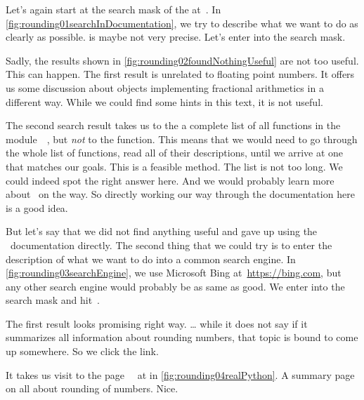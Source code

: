 Let's again start at the search mask of the  at~.
In \cref{fig:rounding01searchInDocumentation}, we try to describe what we want to do as clearly as possible.
 is maybe not very precise.
Let's enter  into the search mask.

Sadly, the results shown in \cref{fig:rounding02foundNothingUseful} are not too useful.
This can happen.
The first result is unrelated to floating point numbers.
It offers us some discussion about objects implementing fractional arithmetics in a different way.
While we could find some hints in this text, it is not useful.

The second search result takes us to the a complete list of all functions in the module~~\cite{PSF:P3D:TPSL:MMF}, but \emph{not} to the  function.
This means that we would need to go through the whole list of functions, read all of their descriptions, until we arrive at one that matches our goals.
This is a feasible method.
The list is not too long.
We could indeed spot the right answer here.
And we would probably learn more about \python\ on the way.
So directly working our way through the documentation here is a good idea.

But let's say that we did not find anything useful and gave up using the \python\ documentation directly.
The second thing that we could try is to enter the description of what we want to do into a common search engine.
In \cref{fig:rounding03searchEngine}, we use Microsoft Bing at~\url{https://bing.com}, but any other search engine would probably be as same as good.
We enter  into the search mask and hit~.

The first result looks promising right way.
 {\dots} while it does not say  if it summarizes all information about rounding numbers, that topic is bound to come up somewhere.
So we click the link.

It takes us visit to the page~~\cite{D2021RPT:A2024HTRNIP} at  in \cref{fig:rounding04realPython}.
A summary page on all about rounding of numbers.
Nice.


